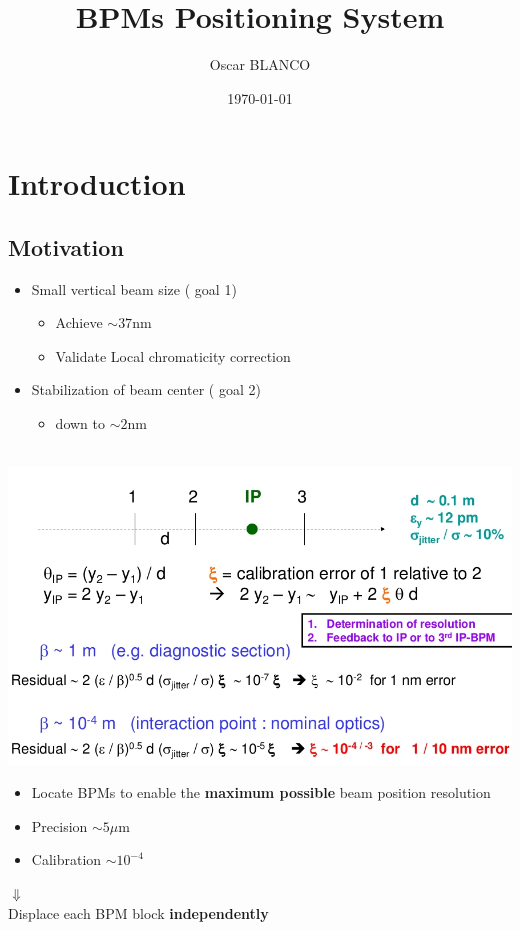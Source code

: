 \documentclass[a4paper,11pt]{book}
\title{BPMs Positioning System}
\author{Oscar BLANCO}
\date{\today}
\begin{document}
\maketitle
\tableofcontents
\listoffigures
\listoftables
\frontmatter
\chapter{Introduction}
\section{Motivation}
{\Large
 \begin{itemize}
  \item Small vertical beam size ({\color{red} goal 1})
  \begin{itemize}
   \item Achieve $\sim 37$nm
   \item Validate Local chromaticity correction
  \end{itemize}
  \item Stabilization of beam center ({\color{blue} goal 2})
  \begin{itemize}
   \item down to $\sim2$nm
  \end{itemize}
 \end{itemize}
}
 $\,$
  \includegraphics[angle=0,scale=0.35]{scalefactors.jpg}
{\LARGE
  \begin{itemize}
   \item Locate BPMs to enable the \textbf{ maximum possible} beam position resolution
   \item Precision $\sim 5\mu$m
   \item Calibration $\sim 10^{-4}$
  \end{itemize}
 \hspace*{5cm}$\Downarrow$\\
 Displace each BPM block \textbf{independently}
 }\par
\end{document}
